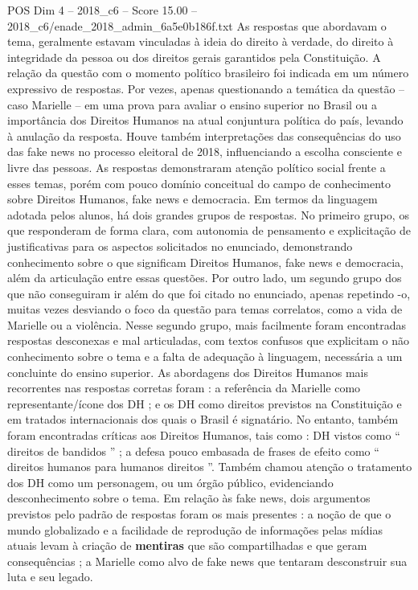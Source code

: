 \begin{textsample}{POS Dim 4 – 2018\_c6 – Score 15.00 – 2018\_c6/enade\_2018\_admin\_6a5e0b186f.txt}
As respostas que abordavam o tema, geralmente estavam vinculadas à ideia do direito à verdade, do direito à integridade da pessoa ou dos direitos gerais garantidos pela Constituição.
A relação da questão com o momento político brasileiro foi indicada em um número expressivo de respostas.
Por vezes, apenas questionando a temática da questão – caso Marielle – em uma prova para avaliar o ensino superior no Brasil ou a importância dos Direitos Humanos na atual conjuntura política do país, levando à anulação da resposta.
Houve também interpretações das consequências do uso das fake news no processo eleitoral de 2018, influenciando a escolha consciente e livre das pessoas.
As respostas demonstraram atenção político social frente a esses temas, porém com pouco domínio conceitual do campo de conhecimento sobre Direitos Humanos, fake news e democracia.
Em termos da linguagem adotada pelos alunos, há dois grandes grupos de respostas.
No primeiro grupo, os que responderam de forma clara, com autonomia de pensamento e explicitação de justificativas para os aspectos solicitados no enunciado, demonstrando conhecimento sobre o que significam Direitos Humanos, fake news e democracia, além da articulação entre essas questões.
Por outro lado, um segundo grupo dos que não conseguiram ir além do que foi citado no enunciado, apenas repetindo -o, muitas vezes desviando o foco da questão para temas correlatos, como a vida de Marielle ou a violência.
Nesse segundo grupo, mais facilmente foram encontradas respostas desconexas e mal articuladas, com textos confusos que explicitam o não conhecimento sobre o tema e a falta de adequação à linguagem, necessária a um concluinte do ensino superior.
As abordagens dos Direitos Humanos mais recorrentes nas respostas corretas foram : a referência da Marielle como representante/ícone dos DH ; e os DH como direitos previstos na Constituição e em tratados internacionais dos quais o Brasil é signatário.
No entanto, também foram encontradas críticas aos Direitos Humanos, tais como : DH vistos como “ direitos de bandidos ” ; a defesa pouco embasada de frases de efeito como “ direitos humanos para humanos direitos ”.
Também chamou atenção o tratamento dos DH como um personagem, ou um órgão público, evidenciando desconhecimento sobre o tema.
Em relação às fake news, dois argumentos previstos pelo padrão de respostas foram os mais presentes : a noção de que o mundo globalizado e a facilidade de reprodução de informações pelas mídias atuais levam à criação de \textbf{mentiras} que são compartilhadas e que geram consequências ; a Marielle como alvo de fake news que tentaram desconstruir sua luta e seu legado.

\end{textsample}
